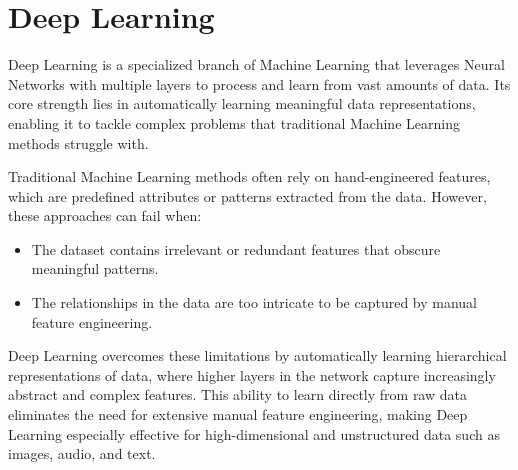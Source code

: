 \section{Deep Learning}

Deep Learning is a specialized branch of Machine Learning that leverages Neural Networks with multiple layers to process and learn from vast amounts of data. 
Its core strength lies in automatically learning meaningful data representations, enabling it to tackle complex problems that traditional Machine Learning methods struggle with.

Traditional Machine Learning methods often rely on hand-engineered features, which are predefined attributes or patterns extracted from the data. 
However, these approaches can fail when:
\begin{itemize}
    \item The dataset contains irrelevant or redundant features that obscure meaningful patterns.
    \item The relationships in the data are too intricate to be captured by manual feature engineering.
\end{itemize}
Deep Learning overcomes these limitations by automatically learning hierarchical representations of data, where higher layers in the network capture increasingly abstract and complex features.
This ability to learn directly from raw data eliminates the need for extensive manual feature engineering, making Deep Learning especially effective for high-dimensional and unstructured data such as images, audio, and text.